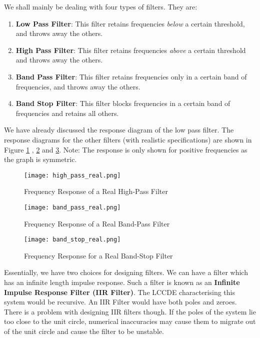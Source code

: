 \documentclass{article}
\theoremstyle{definition}
\begin{document}
We shall mainly be dealing with four types of filters. They are:
\begin{enumerate}
    \item \textbf{Low Pass Filter}: This filter retains frequencies \textit{below} a certain threshold, and throws away the others.
    \item \textbf{High Pass Filter}: This filter retains frequencies \textit{above} a certain threshold and throws away the others.
    \item \textbf{Band Pass Filter}: This filter retains frequencies only in a certain band of frequencies, and throws away the others.
    \item \textbf{Band Stop Filter}: This filter blocks frequencies in a certain band of frequencies and retains all others.
\end{enumerate}

We have already discussed the response diagram of the low pass filter. The response diagrams for the other filters (with realistic specifications) are shown in Figure \ref{fig:high_pass_real} , \ref{fig:band_pass_real} and \ref{fig:band_stop_real}. Note: The response is only shown for positive frequencies as the graph is symmetric.

\begin{figure}[h!]
\centering
\texttt{[image: high\_pass\_real.png]}
\caption{Frequency Response of a Real High-Pass Filter}
\label{fig:high_pass_real}
\end{figure}	 

\begin{figure}[h!]
\centering
\texttt{[image: band\_pass\_real.png]}
\caption{Frequency Response of a Real Band-Pass Filter}
\label{fig:band_pass_real}
\end{figure}	 

\begin{figure}[h!]
\centering
\texttt{[image: band\_stop\_real.png]}
\caption{Frequency Response for a Real Band-Stop Filter}
\label{fig:band_stop_real}
\end{figure}	 

Essentially, we have two choices for designing filters. We can have a filter which has an infinite length impulse response. Such a filter is known as an \textbf{Infinite Impulse Response Filter (IIR Filter)}. The LCCDE characterising this system would be recursive. An IIR Filter would have both poles and zeroes. There is a problem with designing IIR filters though. If the poles of the system lie too close to the unit circle, numerical inaccuracies may cause them to migrate out of the unit circle and cause the filter to be unstable. \smallskip
\end{document}

